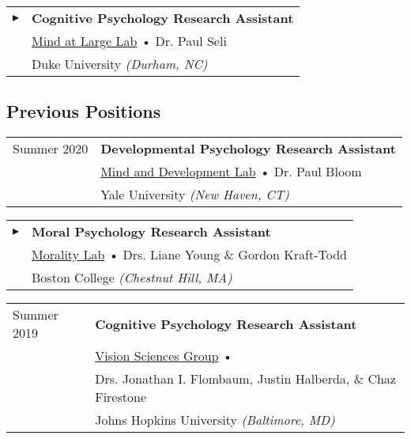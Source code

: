 \documentclass[10pt,a4paper]{cv-nl}
\begin{document}
\vspace{5pt}
\begin{tabular}{p{1in}<{\raggedleft\arraybackslash}p{4.935in}}
$\blacktriangleright$ & \textbf{Cognitive Psychology Research Assistant} \\
& {\href{https://www.mindatlargelab.com/}{Mind at Large Lab}} • Dr. Paul Seli \\
& Duke University \textit{(Durham, NC)} \\
\end{tabular}

\vspace{10pt}
\subsection{Previous Positions}
\vspace{2.5pt}
\begin{tabular}{p{1in}<{\raggedleft\arraybackslash}p{4.935in}}
Summer 2020 & \textbf{Developmental Psychology Research Assistant} \\
& {\href{https://minddevlab.yale.edu/}{Mind and Development Lab}} • Dr. Paul Bloom \\
& Yale University \textit{(New Haven, CT)} \\
\end{tabular}

\vspace{5pt}
\begin{tabular}{p{1in}<{\raggedleft\arraybackslash}p{4.935in}}
$\blacktriangleright$ & \textbf{Moral Psychology Research Assistant} \\
& {\href{https://moralitylab.bc.edu/}{Morality Lab}} • Drs. Liane Young \& Gordon Kraft-Todd\\
& Boston College \textit{(Chestnut Hill, MA)} \\
\end{tabular}

\vspace{5pt}
\begin{tabular}{p{1in}<{\raggedleft\arraybackslash}p{4.935in}}
Summer 2019 & \textbf{Cognitive Psychology Research Assistant} \\
& {\href{http://www.jhuvisionsciencesgroup.org/}{Vision Sciences Group}} • \\ & Drs. Jonathan I. Flombaum, Justin Halberda, 
\& Chaz Firestone \\
& Johns Hopkins University \textit{(Baltimore, MD)} \\
\end{tabular}
\end{document}
